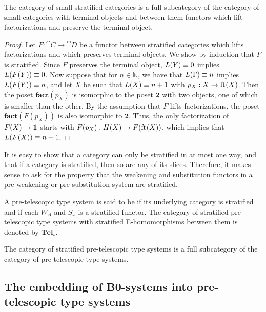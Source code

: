 \begin{lem}
The category of small stratified categories is a full subcategory of the category
of small categories with terminal objects and between them functors which lift 
factorizations and preserve the terminal object.
\end{lem}

\begin{proof}
Let $F:\cat{C}\to\cat{D}$ be a functor between stratified categories which lifts
factorizations and 
which preserves terminal objects. We show by induction that $F$ is stratified.
Since $F$ preserves the terminal object, $L(Y)\equiv 0$ implies $L(F(Y))\equiv 0$.
Now suppose that for $n\in\mathbb{N}$, we have that $L(\Gamma)\equiv n$ implies
$L(F(Y))\equiv n$, and let $X$ be such that $L(X)\equiv n+1$ with
$p_X:X\to\mathrm{ft}_{}(X)$. Then the poset $\mathbf{fact}(p_X)$ is isomorphic to the
poset $\mathbf{2}$ with two objects, one of which is smaller than the other. By the
assumption that $F$ lifts factorizations, the poset $\mathbf{fact}(F(p_X))$
is also isomorphic to $\mathbf{2}$. Thus, the only factorization
of $F(X)\to\mathbf{1}$ starts with $F(p_X):H(X)\to F(\mathrm{ft}_{}(X))$, which implies that
$L(F(X))\equiv n+1$. 
\end{proof}

\begin{rmk}
It is easy to show that a category can only be stratified in at most one way,
and that if a category is stratified, then so are any of its slices. Therefore,
it makes sense to ask for the property that the weakening and substitution
functors in a pre-weakening or pre-substitution system are stratified.
\end{rmk}

\begin{defn}
A pre-telescopic type system is said to be  if its underlying category is
stratified and if each $W_A$ and $S_x$ is a stratified functor. The category of
stratified pre-telescopic type systems with stratified E-homomorphisms between them is denoted by
$\mathbf{Tel}_s$.
\end{defn}

\begin{cor}\label{lem:strat_full}
The category of stratified pre-telescopic type systems is a full subcategory of the category of
pre-telescopic type systems.
\end{cor}

\subsection{The embedding of B0-systems into pre-telescopic type systems}

